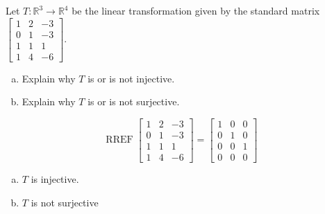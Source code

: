 
\begin{exerciseStatement}
 Let \(T:\mathbb{R}^ 3  \to \mathbb{R}^ 4 \) be the linear transformation given by the standard matrix \( \left[\begin{array}{ccc}
1 & 2 & -3 \\
0 & 1 & -3 \\
1 & 1 & 1 \\
1 & 4 & -6
\end{array}\right] .\)
\begin{enumerate}[(a)]
\item Explain why \(T\) is or is not injective.
\item Explain why \(T\) is or is not surjective.
\end{enumerate}
    
\end{exerciseStatement}
    
\begin{exerciseAnswer} 


\[\operatorname{RREF} \left[\begin{array}{ccc}
1 & 2 & -3 \\
0 & 1 & -3 \\
1 & 1 & 1 \\
1 & 4 & -6
\end{array}\right] = \left[\begin{array}{ccc}
1 & 0 & 0 \\
0 & 1 & 0 \\
0 & 0 & 1 \\
0 & 0 & 0
\end{array}\right] \]


\begin{enumerate}[(a)]
\item \(T\) is injective.
\item \(T\) is not surjective
\end{enumerate}
    
\end{exerciseAnswer}
    
